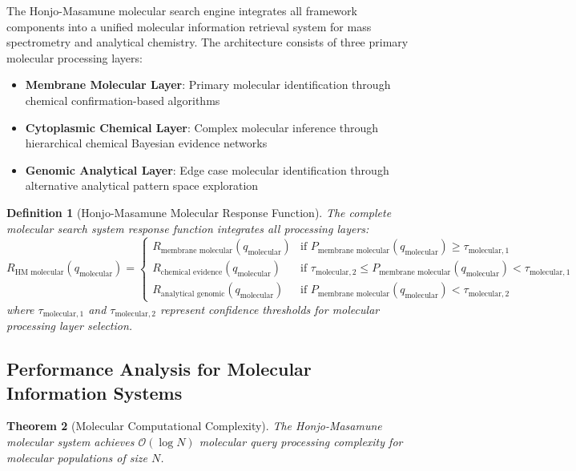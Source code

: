 \documentclass[11pt,a4paper]{article}
\newtheorem{theorem}{Theorem}[section]
\newtheorem{definition}[theorem]{Definition}
\theoremstyle{remark}
\begin{document}
The Honjo-Masamune molecular search engine integrates all framework components into a unified molecular information retrieval system for mass spectrometry and analytical chemistry. The architecture consists of three primary molecular processing layers:

\begin{itemize}
\item \textbf{Membrane Molecular Layer}: Primary molecular identification through chemical confirmation-based algorithms
\item \textbf{Cytoplasmic Chemical Layer}: Complex molecular inference through hierarchical chemical Bayesian evidence networks
\item \textbf{Genomic Analytical Layer}: Edge case molecular identification through alternative analytical pattern space exploration
\end{itemize}

\begin{definition}[Honjo-Masamune Molecular Response Function]
The complete molecular search system response function integrates all processing layers:
\begin{equation}
R_{\text{HM molecular}}(q_{\text{molecular}}) = \begin{cases}
R_{\text{membrane molecular}}(q_{\text{molecular}}) & \text{if } P_{\text{membrane molecular}}(q_{\text{molecular}}) \geq \tau_{\text{molecular},1} \\
R_{\text{chemical evidence}}(q_{\text{molecular}}) & \text{if } \tau_{\text{molecular},2} \leq P_{\text{membrane molecular}}(q_{\text{molecular}}) < \tau_{\text{molecular},1} \\
R_{\text{analytical genomic}}(q_{\text{molecular}}) & \text{if } P_{\text{membrane molecular}}(q_{\text{molecular}}) < \tau_{\text{molecular},2}
\end{cases}
\end{equation}
where $\tau_{\text{molecular},1}$ and $\tau_{\text{molecular},2}$ represent confidence thresholds for molecular processing layer selection.
\end{definition}

\subsection{Performance Analysis for Molecular Information Systems}

\begin{theorem}[Molecular Computational Complexity]
The Honjo-Masamune molecular system achieves $\mathcal{O}(\log N)$ molecular query processing complexity for molecular populations of size $N$.
\end{theorem}
\end{document}
